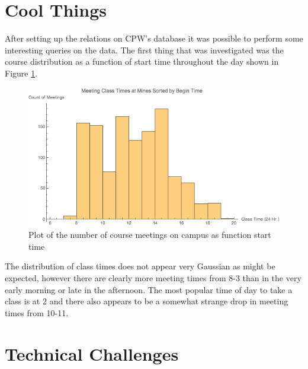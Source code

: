 \documentclass[12pt,letterpaper,titlepage]{article}
\begin{document}
\section{Cool Things}
After setting up the relations on CPW's database it was possible to perform some interesting queries on the data. The first thing that was investigated was the course distribution as a function of start time throughout the day shown in Figure \ref{fig:starthours}.

\begin{figure}[H]
\centering
\includegraphics[width = 4 in]{classmeetinghist.png}
\caption{\label{fig:starthours}Plot of the number of course meetings on campus as function start time}
\end{figure}

The distribution of class times does not appear very Gaussian as might be expected, however there are clearly more meeting times from 8-3 than in the very early morning or late in the afternoon. The most popular time of day to take a class is at 2 and there also appears to be a somewhat strange drop in meeting times from 10-11. 


\section{Technical Challenges}

\end{document}
